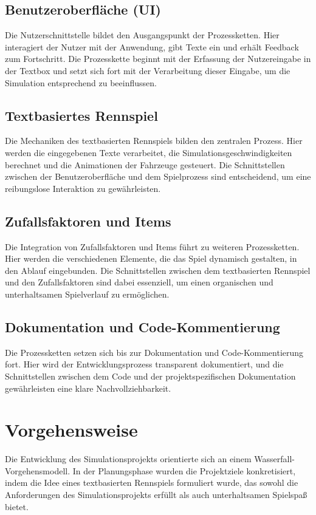 \documentclass[hidelinks,12pt]{article}
\begin{document}
\subsection{Benutzeroberfläche (UI)}
Die Nutzerschnittstelle bildet den Ausgangspunkt der Prozessketten. Hier interagiert der Nutzer mit der Anwendung, gibt Texte ein und erhält Feedback zum Fortschritt. Die Prozesskette beginnt mit der Erfassung der Nutzereingabe in der Textbox und setzt sich fort mit der Verarbeitung dieser Eingabe, um die Simulation entsprechend zu beeinflussen.

\subsection{Textbasiertes Rennspiel}
Die Mechaniken des textbasierten Rennspiels bilden den zentralen Prozess. Hier werden die eingegebenen Texte verarbeitet, die Simulationsgeschwindigkeiten berechnet und die Animationen der Fahrzeuge gesteuert. Die Schnittstellen zwischen der Benutzeroberfläche und dem Spielprozess sind entscheidend, um eine reibungslose Interaktion zu gewährleisten.

\subsection{Zufallsfaktoren und Items}
Die Integration von Zufallsfaktoren und Items führt zu weiteren Prozessketten. Hier werden die verschiedenen Elemente, die das Spiel dynamisch gestalten, in den Ablauf eingebunden. Die Schnittstellen zwischen dem textbasierten Rennspiel und den Zufallsfaktoren sind dabei essenziell, um einen organischen und unterhaltsamen Spielverlauf zu ermöglichen.

\subsection{Dokumentation und Code-Kommentierung}
Die Prozessketten setzen sich bis zur Dokumentation und Code-Kommentierung fort. Hier wird der Entwicklungsprozess transparent dokumentiert, und die Schnittstellen zwischen dem Code und der projektspezifischen Dokumentation gewährleisten eine klare Nachvollziehbarkeit.

\section{Vorgehensweise}
Die Entwicklung des Simulationsprojekts orientierte sich an einem Wasserfall-Vorgehensmodell. In der Planungsphase wurden die Projektziele konkretisiert, indem die Idee eines textbasierten Rennspiels formuliert wurde, das sowohl die Anforderungen des Simulationsprojekts erfüllt als auch unterhaltsamen Spielspaß bietet.
\end{document}
